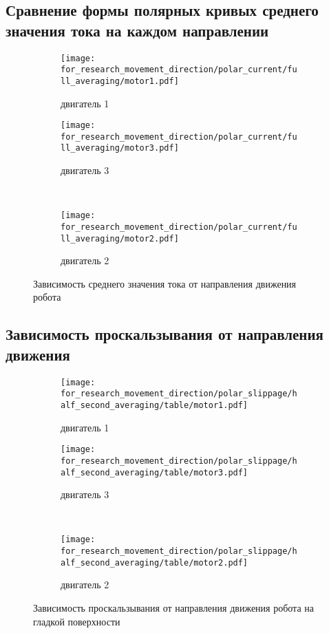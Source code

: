 \subsection{Сравнение формы полярных кривых среднего значения тока на каждом направлении}

\begin{figure}[H]
    \centering
    \begin{subfigure}{0.49\textwidth}
        \centering
        \texttt{[image: for\_research\_movement\_direction/polar\_current/full\_averaging/motor1.pdf]}
        \caption{двигатель 1}
    \end{subfigure}
    \hspace{0.005\textwidth}
    \begin{subfigure}{0.49\textwidth}
        \centering
        \texttt{[image: for\_research\_movement\_direction/polar\_current/full\_averaging/motor3.pdf]}
        \caption{двигатель 3}
    \end{subfigure} \\
    \vspace{4pt}
    \centering
    \begin{subfigure}{0.49\textwidth}
        \centering
        \texttt{[image: for\_research\_movement\_direction/polar\_current/full\_averaging/motor2.pdf]}
        \caption{двигатель 2}
    \end{subfigure}
    \caption{Зависимость среднего значения тока от направления движения робота}
\end{figure}

\subsection{Зависимость проскальзывания от направления движения}

\begin{figure}[H]
    \centering
    \begin{subfigure}{0.49\textwidth}
        \centering
        \texttt{[image: for\_research\_movement\_direction/polar\_slippage/half\_second\_averaging/table/motor1.pdf]}
        \caption{двигатель 1}
    \end{subfigure}
    \hspace{0.005\textwidth}
    \begin{subfigure}{0.49\textwidth}
        \centering
        \texttt{[image: for\_research\_movement\_direction/polar\_slippage/half\_second\_averaging/table/motor3.pdf]}
        \caption{двигатель 3}
    \end{subfigure} \\
    \vspace{4pt}
    \centering
    \begin{subfigure}{0.49\textwidth}
        \centering
        \texttt{[image: for\_research\_movement\_direction/polar\_slippage/half\_second\_averaging/table/motor2.pdf]}
        \caption{двигатель 2}
    \end{subfigure}
    \caption{Зависимость проскальзывания от направления движения робота на гладкой поверхности}
\end{figure}


